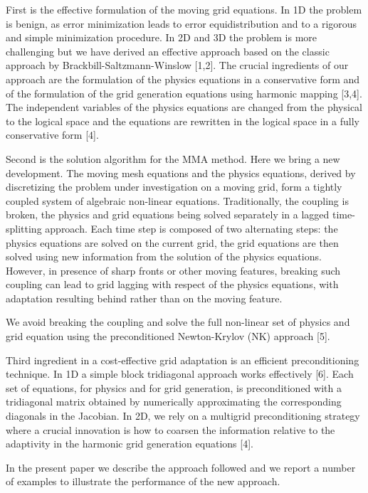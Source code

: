 \documentclass[twosided]{report}
\begin{document}
First is the effective
formulation of the moving grid equations. In 1D the problem
is benign, as error minimization leads to error
equidistribution and to a rigorous and simple minimization
procedure. In 2D and 3D the problem is more challenging but
we have derived an effective approach based on the classic
approach by Brackbill-Saltzmann-Winslow [1,2]. The crucial
ingredients of our approach are the formulation of the
physics equations in a conservative form and of the
formulation of the grid generation equations using harmonic
mapping [3,4]. The independent variables of the physics
equations are changed from the physical to the logical space
and the equations are rewritten in the logical space in a
fully conservative form [4].

Second is the solution
algorithm for the MMA method. Here we bring a new
development. The moving mesh equations and the physics
equations, derived by discretizing the problem under
investigation on a moving grid, form a tightly coupled
system of algebraic non-linear equations. Traditionally, the
coupling is broken, the physics and grid equations being
solved separately in a lagged time-splitting approach. Each
time step is composed of two alternating steps: the physics
equations are solved on the current grid, the grid equations
are then solved using new information from the solution of
the physics equations. However, in presence of sharp fronts
or other moving features, breaking such coupling can lead to
grid lagging with respect of the physics equations, with
adaptation resulting behind rather than on the moving
feature.

 We avoid breaking the coupling and solve the
full non-linear set of physics and grid equation using the
preconditioned Newton-Krylov (NK) approach [5].

Third
ingredient in a cost-effective grid adaptation is an
efficient preconditioning technique. In 1D a simple block
tridiagonal approach works effectively [6]. Each set of
equations, for physics and for grid generation, is
preconditioned with a tridiagonal matrix obtained by
numerically approximating the corresponding diagonals in the
Jacobian. In 2D, we rely on a multigrid preconditioning
strategy where a crucial innovation is how to coarsen the
information relative to the adaptivity in the harmonic grid
generation equations [4].

In the present paper we
describe the approach followed and we report a number of
examples to illustrate the performance of the new approach.
\end{document}
